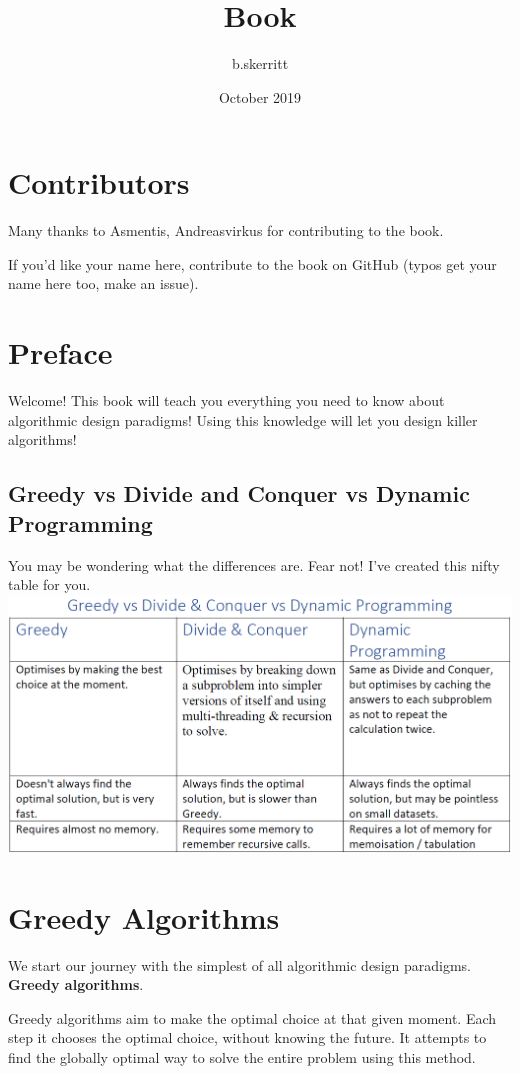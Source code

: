 \documentclass{article}
\title{Book}
\author{b.skerritt }
\date{October 2019}
\begin{document}
\raggedright

\newpage
\section{Contributors}
Many thanks to Asmentis, Andreasvirkus for contributing to the book.

If you'd like your name here, contribute to the book on GitHub (typos get your name here too, make an issue).
\tableofcontents
\newpage
{}
\setcounter{page}{1}
\section{Preface}
Welcome! This book will teach you everything you need to know about algorithmic design paradigms! Using this knowledge will let you design killer algorithms! 

\subsection{Greedy vs Divide and Conquer vs Dynamic Programming}
You may be wondering what the differences are. Fear not! I've created this nifty table for you.
\includegraphics[width=\textwidth,height=\textheight,keepaspectratio]{images/vsdivide.png}
\newpage

\section{Greedy Algorithms}
We start our journey with the simplest of all algorithmic design paradigms. \textbf{Greedy algorithms}.

Greedy algorithms aim to make the optimal choice at that given moment. Each step it chooses the optimal choice, without knowing the future. It attempts to find the globally optimal way to solve the entire problem using this method.
\end{document}
